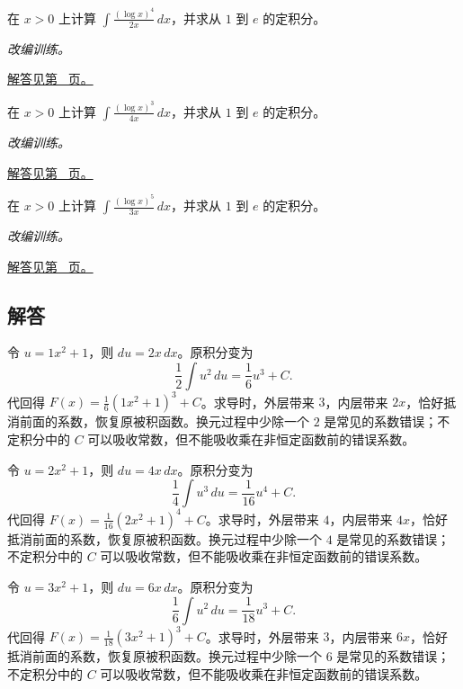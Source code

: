 \documentclass[12pt,fontset=fandol]{ctexart}
\begin{document}
\begin{example}[对数幂与变量范围]\label{ex:c12q22}
在 $x>0$ 上计算 $\displaystyle\int\frac{(\log x)^{4}}{2x}\,dx$，并求从 $1$ 到 $e$ 的定积分。
\par\textit{改编训练。}\par\hyperref[ans:c12q22]{解答见第~\pageref{ans:c12q22} 页。}
\end{example}
\begin{example}[对数幂与变量范围]\label{ex:c12q23}
在 $x>0$ 上计算 $\displaystyle\int\frac{(\log x)^{3}}{4x}\,dx$，并求从 $1$ 到 $e$ 的定积分。
\par\textit{改编训练。}\par\hyperref[ans:c12q23]{解答见第~\pageref{ans:c12q23} 页。}
\end{example}
\begin{example}[对数幂与变量范围]\label{ex:c12q24}
在 $x>0$ 上计算 $\displaystyle\int\frac{(\log x)^{5}}{3x}\,dx$，并求从 $1$ 到 $e$ 的定积分。
\par\textit{改编训练。}\par\hyperref[ans:c12q24]{解答见第~\pageref{ans:c12q24} 页。}
\end{example}
\subsection{解答}
\begin{solve}\label{ans:c12q1}
令 $u=1x^2+1$，则 $du=2x\,dx$。原积分变为
\[
\frac1{2}\int u^{2}\,du=\frac{1}{6}u^{3}+C.
\]
代回得 $F(x)=\frac{1}{6}(1x^2+1)^{3}+C$。求导时，外层带来 $3$，内层带来 $2x$，恰好抵消前面的系数，恢复原被积函数。换元过程中少除一个 $2$ 是常见的系数错误；不定积分中的 $C$ 可以吸收常数，但不能吸收乘在非恒定函数前的错误系数。
\end{solve}

\begin{solve}\label{ans:c12q2}
令 $u=2x^2+1$，则 $du=4x\,dx$。原积分变为
\[
\frac1{4}\int u^{3}\,du=\frac{1}{16}u^{4}+C.
\]
代回得 $F(x)=\frac{1}{16}(2x^2+1)^{4}+C$。求导时，外层带来 $4$，内层带来 $4x$，恰好抵消前面的系数，恢复原被积函数。换元过程中少除一个 $4$ 是常见的系数错误；不定积分中的 $C$ 可以吸收常数，但不能吸收乘在非恒定函数前的错误系数。
\end{solve}

\begin{solve}\label{ans:c12q3}
令 $u=3x^2+1$，则 $du=6x\,dx$。原积分变为
\[
\frac1{6}\int u^{2}\,du=\frac{1}{18}u^{3}+C.
\]
代回得 $F(x)=\frac{1}{18}(3x^2+1)^{3}+C$。求导时，外层带来 $3$，内层带来 $6x$，恰好抵消前面的系数，恢复原被积函数。换元过程中少除一个 $6$ 是常见的系数错误；不定积分中的 $C$ 可以吸收常数，但不能吸收乘在非恒定函数前的错误系数。
\end{solve}
\end{document}
